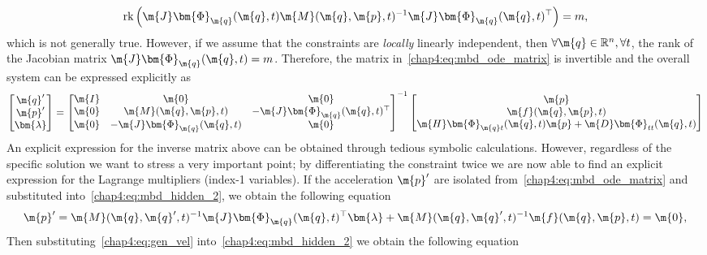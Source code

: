 %
\begin{equation}
  \mathrm{rk}\left( \m{J}\bm{\Phi}_{\m{q}}(\m{q}, t) \m{M}(\m{q}, \m{p}, t)^{-1} \m{J}\bm{\Phi}_{\m{q}}(\m{q}, t)^{\top}\right) = m \text{,}
  \label{chap4:eq:compression}
\end{equation}
%
which is not generally true. However, if we assume that the constraints are \emph{locally} linearly independent, then $\forall\m{q}\in\mathbb{R}^{n},\forall t$, the rank of the Jacobian matrix $\m{J}\bm{\Phi}_{\m{q}}(\m{q}, t) = m$. Therefore, the matrix in~\eqref{chap4:eq:mbd_ode_matrix} is invertible and the overall system can be expressed explicitly as
%
\begin{equation*}
  \begin{bmatrix}
    \m{q}^{\prime} \\ \m{p}^{\prime} \\ \bm{\lambda}
  \end{bmatrix} = \begin{bmatrix}
    \m{I} & \m{0} & \m{0} \\
    \m{0} & \m{M}(\m{q}, \m{p}, t) & -\m{J}\bm{\Phi}_{\m{q}}(\m{q}, t)^{\top} \\
    \m{0} & -\m{J}\bm{\Phi}_{\m{q}}(\m{q}, t) & \m{0}
  \end{bmatrix}^{-1}
  \begin{bmatrix}
    \m{p} \\
    \m{f}(\m{q},\m{p},t) \\
    \m{H}\bm{\Phi}_{\m{q}t}(\m{q}, t)\m{p} + \m{D}\bm{\Phi}_{tt}(\m{q}, t)
  \end{bmatrix}
\end{equation*}
%
An explicit expression for the inverse matrix above can be obtained through tedious symbolic calculations. However, regardless of the specific solution we want to stress a very important point; by differentiating the constraint twice we are now able to find an explicit expression for the Lagrange multipliers (index-1 variables). If the acceleration $\m{p}^{\prime}$ are isolated from~\eqref{chap4:eq:mbd_ode_matrix} and substituted into~\eqref{chap4:eq:mbd_hidden_2}, we obtain the following equation
%
\begin{equation}
  \m{p}^{\prime} = \m{M}(\m{q}, \m{q}^{\prime}, t)^{-1} \m{J}\bm{\Phi}_{\m{q}}(\m{q}, t)^{\top}\bm{\lambda} + \m{M}(\m{q}, \m{q}^{\prime}, t)^{-1}\m{f}(\m{q},\m{p},t) = \m{0} \text{,}
  \label{chap4:eq:gen_vel}
\end{equation}
%
Then substituting~\eqref{chap4:eq:gen_vel} into~\eqref{chap4:eq:mbd_hidden_2} we obtain the following equation
